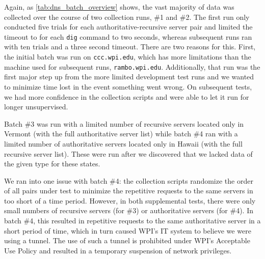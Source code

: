 Again, as \cref{tab:dns_batch_overview} shows, the vast majority of data was collected over the course of two collection runs, \#1 and \#2. The first run only conducted five trials for each authoritative-recursive server pair and limited the timeout to for each \texttt{dig} command to two seconds, whereas subsequent runs ran with ten trials and a three second timeout. There are two reasons for this. First, the initial batch was run on \texttt{ccc.wpi.edu}, which has more limitations than the machine used for subsequent runs, \texttt{rambo.wpi.edu}. Additionally, that run was the first major step up from the more limited development test runs and we wanted to minimize time lost in the event something went wrong. On subsequent tests, we had more confidence in the collection scripts and were able to let it run for longer unsupervised.

Batch \#3 was run with a limited number of recursive servers located only in Vermont (with the full authoritative server list) while batch \#4 ran with a limited number of authoritative servers located only in Hawaii (with the full recursive server list). These were run after we discovered that we lacked data of the given type for these states. 

We ran into one issue with batch \#4: the collection scripts randomize the order of all pairs under test to minimize the repetitive requests to the same \dns servers in too short of a time period. However, in both supplemental tests, there were only small numbers of recursive servers (for \#3) or authoritative servers (for \#4). In batch \#4, this resulted in repetitive requests to the same authoritative server in a short period of time, which in turn caused WPI's IT system to believe we were using a \dns tunnel. The use of such a tunnel is prohibited under WPI's Acceptable Use Policy and resulted in a temporary suspension of network privileges.
